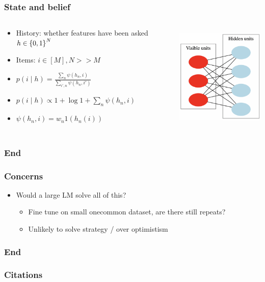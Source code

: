 \documentclass{beamer}
\begin{document}
\begin{frame}
\frametitle{State and belief}
\begin{columns}
\begin{column}{0.55\textwidth}
\begin{itemize}
\item History: whether features have been asked $h \in \left\{0,1\right\}^N$
\item Items: $i \in [M], N >> M$
\item $p(i \mid h) = \frac{\sum_n \psi(h_n, i)}{\sum_{i',n} \psi(h_n, i')}$
\item  $p(i \mid h)\propto 1 + \log 1 + \sum_n \psi(h_n, i)$
\item $\psi(h_n, i) = w_n 1(h_n(i))$ 
\end{itemize}
\end{column}
\begin{column}{0.45\textwidth}
\centering
\includegraphics[height=2in]{img/rbm.png}
\end{column}
\end{columns}
\end{frame}

\begin{frame}
\frametitle{End}
\end{frame}


\begin{frame}
\frametitle{Concerns}
\begin{itemize}
\item Would a large LM solve all of this?
    \begin{itemize}
    \item Fine tune on small onecommon dataset, are there still repeats?
    \item Unlikely to solve strategy / over optimistism
    \end{itemize}
\end{itemize}
\end{frame}

\begin{frame}
\frametitle{End}
\end{frame}



\begin{frame}[allowframebreaks]
\frametitle{Citations}

\end{frame}
\end{document}
